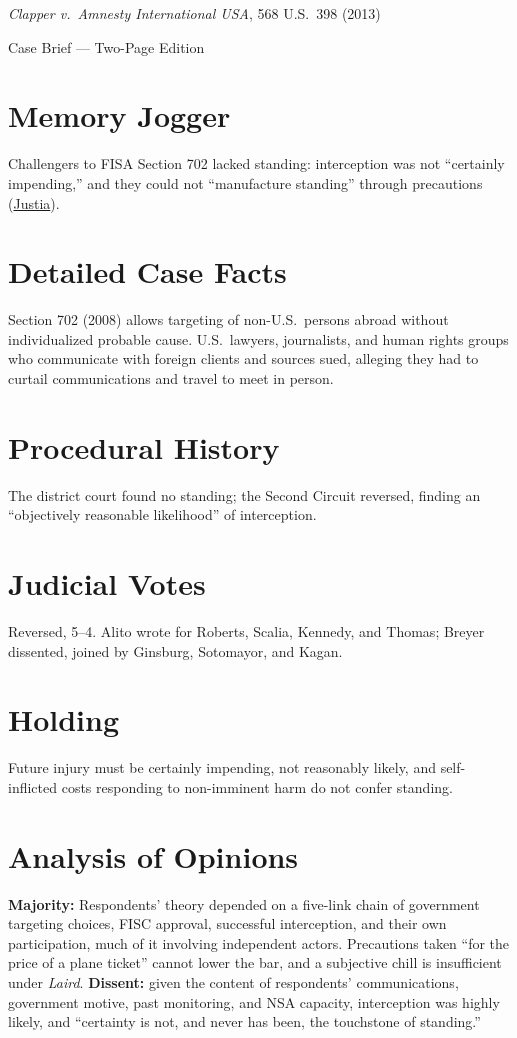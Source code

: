 \documentclass[12pt]{article}
\begin{document}
\begin{center}
{\LARGE \textit{Clapper v.\ Amnesty International USA}, 568 U.S.\ 398 (2013)\par}
\vspace{0.5em}
{\large Case Brief --- Two-Page Edition\par}
\end{center}

\section{Memory Jogger}
Challengers to FISA Section 702 lacked standing: interception was not ``certainly impending,'' and they could not ``manufacture standing'' through precautions (\href{https://supreme.justia.com/cases/federal/us/568/398/}{Justia}).

\section{Detailed Case Facts}
Section 702 (2008) allows targeting of non-U.S.\ persons abroad without individualized probable cause. U.S.\ lawyers, journalists, and human rights groups who communicate with foreign clients and sources sued, alleging they had to curtail communications and travel to meet in person.

\section{Procedural History}
The district court found no standing; the Second Circuit reversed, finding an ``objectively reasonable likelihood'' of interception.

\section{Judicial Votes}
Reversed, 5--4. Alito wrote for Roberts, Scalia, Kennedy, and Thomas; Breyer dissented, joined by Ginsburg, Sotomayor, and Kagan.

\section{Holding}
Future injury must be certainly impending, not reasonably likely, and self-inflicted costs responding to non-imminent harm do not confer standing.

\section{Analysis of Opinions}
\textbf{Majority:} Respondents' theory depended on a five-link chain of government targeting choices, FISC approval, successful interception, and their own participation, much of it involving independent actors. Precautions taken ``for the price of a plane ticket'' cannot lower the bar, and a subjective chill is insufficient under \textit{Laird}. \textbf{Dissent:} given the content of respondents' communications, government motive, past monitoring, and NSA capacity, interception was highly likely, and ``certainty is not, and never has been, the touchstone of standing.''
\end{document}
